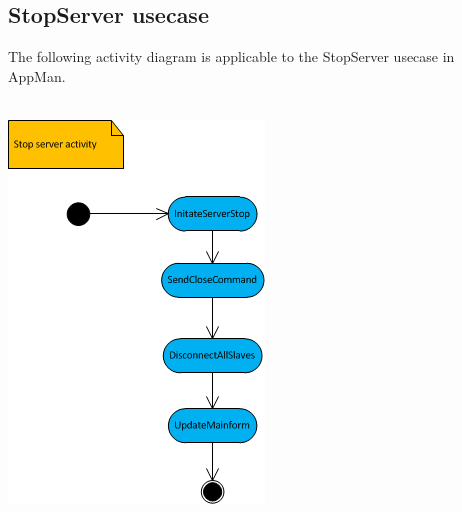 \documentclass[a4paper,12pt,final]{article}
\begin{document}
\subsection{StopServer usecase}
The following activity diagram is applicable to the StopServer usecase in AppMan.\\
\textbf{\\}
\begin{center}
\includegraphics[scale=1]{StopServer.png}
\end{center}

\newpage
\end{document}

